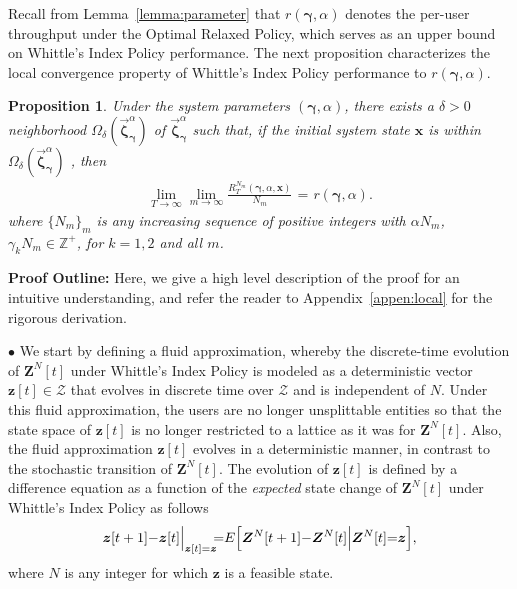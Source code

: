 \documentclass[11pt,twocolumn]{IEEEtran}
\newtheorem{proposition}{Proposition}
\begin{document}
Recall from Lemma~\ref{lemma:parameter} that $r(\bm \gamma, \alpha)$
denotes the per-user throughput under the Optimal Relaxed Policy,
which serves as an upper bound on Whittle's Index Policy
performance. The next proposition characterizes the local
convergence property of Whittle's Index Policy performance to $r(\bm
\gamma, \alpha)$.

\begin{proposition}
\label{prop:local_conv} Under the system parameters $(\bm \gamma,
\alpha)$, there exists a $\delta >0$ neighborhood
$\Omega_{\delta}(\vec{\bm \zeta}^{\alpha}_{\bm \gamma})$ of
$\vec{\bm \zeta}^{\alpha}_{\bm \gamma}$ such that, if the initial
system state $\bm x$ is within $\Omega_{\delta}(\vec{\bm
\zeta}^{\alpha}_{\bm \gamma})$ , then
\begin{align}
\lim_{T \rightarrow \infty} \lim_{m \rightarrow \infty}  \frac{R_{T}^{N_m}(\bm \gamma, \alpha, \bm x)}{N_m}\hspace{1pt}{=}\hspace{1pt}r(\bm \gamma, \alpha). \nonumber
\end{align}
where $\{ N_m \}_m$ is any increasing sequence of positive integers
with $\alpha N_m$, $\gamma_k N_m \in \mathbb{Z}^+$, for $k=1,2$ and
all $m$.
\end{proposition}



\noindent \textbf{Proof Outline:} Here, we give a high level
description of the proof for an intuitive understanding, and refer the reader to
Appendix~\ref{appen:local} for the rigorous
derivation. \vspace{1pt}

$\bullet$ We start by defining a fluid approximation, whereby the
discrete-time evolution of ${ \bm Z}^N[t]$ under Whittle's Index
Policy is modeled as a deterministic vector ${ \bm z}[t] \in
\mathcal{Z}$ that evolves {in discrete time} over $\mathcal{Z}$ and is independent of $N.$ Under this fluid approximation, the users are no longer
unsplittable entities so that the state space of ${ \bm z}[t]$ is no
longer restricted to a lattice as it was for ${ \bm Z}^N[t]$. Also,
the fluid approximation ${ \bm z}[t]$ evolves in a deterministic
manner, in contrast to the stochastic transition of ${\bm Z}^N[t]$.
The evolution of ${\bm z}[t]$ is defined by a {difference} equation
as a function of the \emph{expected} state change of ${ \bm
Z}^N[t]$ under Whittle's Index Policy as follows
\begin{align}
\label{eq:fluid_sketch}{\bm z[t+1] {-} \bm z[t] \Big |_{{ \bm
z}[t]={ \bm z}} }\hspace{-3pt}{=} E\Big[{ \bm Z}^N[t+1]{-}{ \bm Z}^N[t] \Big| { \bm
Z}^N[t]{=}{ \bm z}\Big],
\end{align}
where $N$ is any integer for which ${\bm z}$ is a feasible state.
\end{document}
